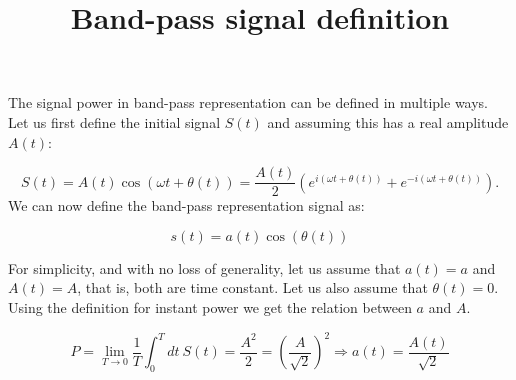 \documentclass{article}
\begin{document}
\title{Band-pass signal definition}
\maketitle

The signal power in band-pass representation can be defined in multiple ways. Let us first define the initial signal $S(t)$ and assuming this has a real amplitude $A(t)$:

\begin{equation}
S(t)=A(t)\cos(\omega t+\theta(t))=\frac{A(t)}{2}\left(e^{i(\omega t+\theta(t))}+e^{-i(\omega t+\theta(t))}\right).
\end{equation}
%
We can now define the band-pass representation signal as:

\begin{equation}
s(t)=a(t)\cos(\theta(t)) 
\end{equation}

For simplicity, and with no loss of generality, let us assume that $a(t)=a$ and $A(t)=A$, that is, both are time constant. Let us also assume that $\theta(t)=0$. Using the definition for instant power we get the relation between $a$ and $A$. 

\begin{equation}
P=\lim_{T \to 0}\frac{1}{T}\int_0^Tdt~S(t)=\frac{A^2}{2}=\left(\frac{A}{\sqrt{2}}\right)^2\Rightarrow a(t)=\frac{A(t)}{\sqrt{2}}
\end{equation}
\end{document}

